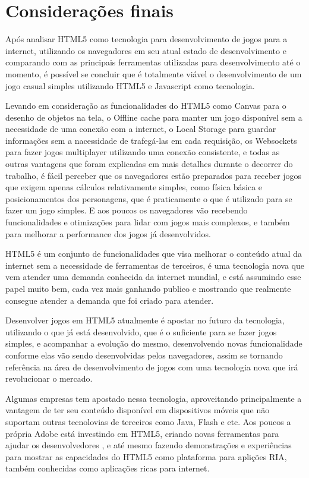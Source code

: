 \section{Considerações finais}

Após analisar HTML5 como tecnologia para desenvolvimento de jogos para
a internet, utilizando os navegadores em seu atual estado de
desenvolvimento e comparando com as principais ferramentas utilizadas
para desenvolvimento até o momento, é possível se concluir que é
totalmente viável o desenvolvimento de um jogo casual simples
utilizando HTML5 e Javascript como tecnologia.

Levando em consideração as funcionalidades do HTML5 como Canvas para o
desenho de objetos na tela, o Offline cache para manter um jogo
disponível sem a necessidade de uma conexão com a internet, o Local
Storage para guardar informações sem a nacessidade de trafegá-las em
cada requisição, os Websockets para fazer jogos multiplayer utilizando
uma conexão consistente, e todas as outras vantagens que foram
explicadas em mais detalhes durante o decorrer do trabalho,
é fácil perceber que os navegadores estão preparados para
receber jogos que exigem apenas cálculos relativamente
simples, como física básica e posicionamentos dos personagens, que é
praticamente o que é utilizado para se fazer um jogo simples. E aos
poucos os navegadores vão recebendo funcionalidades e otimizações para
lidar com jogos mais complexos, e também para melhorar a performance
dos jogos já desenvolvidos.

HTML5 é um conjunto de funcionalidades que visa melhorar o conteúdo
atual da internet sem a necessidade de ferramentas de terceiros, é uma
tecnologia nova que vem atender uma demanda conhecida da
internet mundial, e está assumindo esse papel muito bem, cada vez mais
ganhando publico e mostrando que realmente consegue atender a demanda
que foi criado para atender.

Desenvolver jogos em HTML5 atualmente é
apostar no futuro da tecnologia, utilizando o que já está
desenvolvido, que é o suficiente para se fazer jogos simples, e
acompanhar a evolução do mesmo, desenvolvendo novas funcionalidade
conforme elas vão sendo desenvolvidas pelos navegadores, assim se
tornando referência na área de desenvolvimento de jogos com uma
tecnologia nova que irá revolucionar o mercado.

Algumas empresas tem apostado nessa tecnologia, aproveitando
principalmente a vantagem de ter seu conteúdo disponível em
dispositivos móveis que não suportam outras tecnolovias de terceiros
como Java, Flash e etc. Aos poucos a própria Adobe está investindo em
HTML5, criando novas ferramentas para ajudar
os desenvolvedores \cite{website:adobeedge}, e até mesmo fazendo
demonstrações e experiências para mostrar as capacidades do HTML5 como
plataforma para aplições RIA, também conhecidas como aplicações ricas
para internet.

